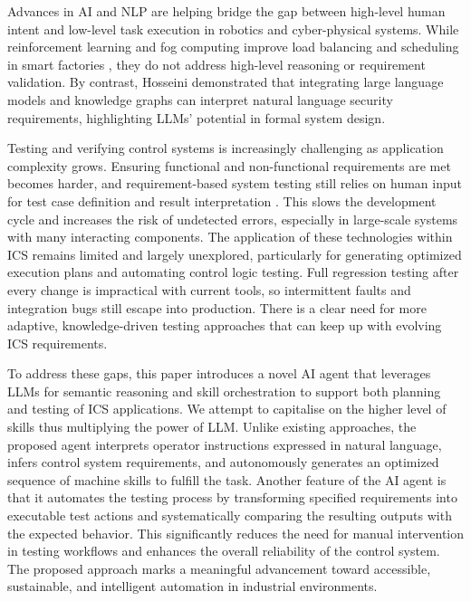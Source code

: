 \begin{bibunit}
    Advances in AI and NLP are helping bridge the gap between high-level human intent and low-level task execution in robotics and cyber-physical systems. While reinforcement learning and fog computing improve load balancing and scheduling in smart factories \cite{wicaksono2024artificial}, they do not address high-level reasoning or requirement validation. By contrast, Hosseini \etal \cite{10904297} demonstrated that integrating large language models and knowledge graphs can interpret natural language security requirements, highlighting LLMs’ potential in formal system design. 
    
    Testing and verifying control systems is increasingly challenging as application complexity grows. Ensuring functional and non-functional requirements are met becomes harder, and requirement-based system testing still relies on human input for test case definition and result interpretation \cite{dos2020software}. This slows the development cycle and increases the risk of undetected errors, especially in large-scale systems with many interacting components. The application of these technologies within ICS remains limited and largely unexplored, particularly for generating optimized execution plans and automating control logic testing. Full regression testing after every change is impractical with current tools, so intermittent faults and integration bugs still escape into production. There is a clear need for more adaptive, knowledge-driven testing approaches that can keep up with evolving ICS requirements.
    
    To address these gaps, this paper introduces a novel AI agent that leverages LLMs for semantic reasoning and skill orchestration to support both planning and testing of ICS applications. We attempt to capitalise on the higher level of skills thus multiplying the power of LLM. Unlike existing approaches, the proposed agent interprets operator instructions expressed in natural language, infers control system requirements, and autonomously generates an optimized sequence of machine skills to fulfill the task. Another feature of the AI agent is that it automates the testing process by transforming specified requirements into executable test actions and systematically comparing the resulting outputs with the expected behavior. This significantly reduces the need for manual intervention in testing workflows and enhances the overall reliability of the control system. The proposed approach marks a meaningful advancement toward accessible, sustainable, and intelligent automation in industrial environments.
    

\end{bibunit}
